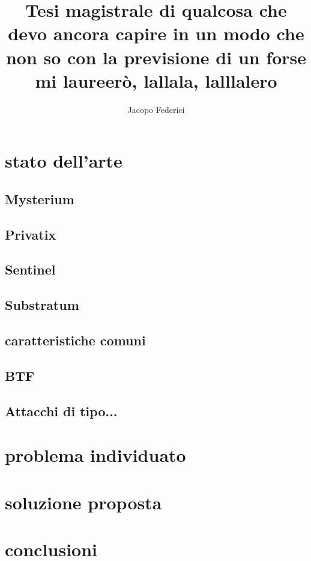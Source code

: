 \documentclass[]{article}
\title{Tesi magistrale di qualcosa che devo ancora capire in un modo che non so con la previsione di un forse mi laureerò, lallala, lalllalero}
\author{Jacopo Federici}
\begin{document}
	
	\maketitle
	
	\begin{abstract}
		
	\end{abstract}
	
	\section{stato dell'arte}
	
	\subsection{Mysterium}
	\subsection{Privatix}
	\subsection{Sentinel}
	\subsection{Substratum}
	\subsection{caratteristiche comuni}
	\subsection{BTF}	
	\subsection{Attacchi di tipo...}
		
	\section{problema individuato}
	\section{soluzione proposta}
	\section{conclusioni}
	
	
\end{document}
